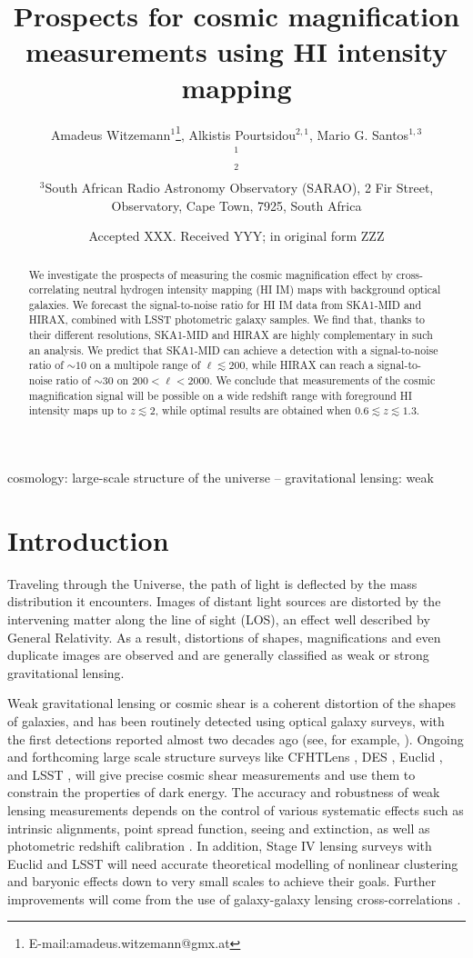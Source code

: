 \documentclass[useAMS,usenatbib]{mnras}
\title[Magnification measurements with HI intensity mapping]
{Prospects for cosmic magnification measurements using HI intensity mapping}
\author[]{Amadeus Witzemann$^{1}$\thanks{E-mail:amadeus.witzemann@gmx.at}, Alkistis Pourtsidou$^{2,1}$, Mario G. Santos$^{1, 3}$\\
$^{1}$\uwc\\
$^{2}$\qmu\\
$^{3}$South African Radio Astronomy Observatory (SARAO), 2 Fir Street, Observatory, Cape Town, 7925, South Africa
}
\date{Accepted XXX. Received YYY; in original form ZZZ}
\begin{document}
\maketitle

\begin{abstract}
We investigate the prospects of measuring the cosmic magnification effect by cross-correlating neutral hydrogen intensity mapping (HI IM) maps with background optical galaxies. We forecast the signal-to-noise ratio for HI IM data from SKA1-MID and HIRAX, combined with LSST photometric galaxy samples. We find that, thanks to their different resolutions, SKA1-MID and HIRAX are highly complementary in such an analysis.
We predict that SKA1-MID can achieve a detection with a signal-to-noise ratio of $\sim 10$ on a multipole range of $\ell \lesssim 200$, while HIRAX can reach a signal-to-noise ratio of $\sim 30$ on $200 < \ell < 2000$.
 We conclude that measurements of the cosmic magnification signal will be possible on a wide redshift range with foreground HI intensity maps up to $z \lesssim 2$, while optimal results are obtained when $0.6 \lesssim z \lesssim 1.3$.
\end{abstract}

\begin{keywords}
cosmology: large-scale structure of the universe -- gravitational lensing: weak
\end{keywords}



\section{Introduction}
Traveling through the Universe, the path of light is deflected by the mass distribution it encounters. Images of distant light sources are distorted by the intervening matter along the line of sight (LOS), an effect well described by General Relativity. As a result, distortions of shapes, magnifications and even duplicate images are observed and are generally classified as weak or strong gravitational lensing.

Weak gravitational lensing or cosmic shear is a coherent distortion of the shapes of galaxies, and has been routinely detected using optical galaxy surveys, with the first detections reported almost two decades ago (see, for example, \citet{Bacon:2000sy,Kaiser:2000if,vanWaerbeke:2000rm,Wittman:2000tc}). Ongoing and forthcoming large scale structure surveys like CFHTLens
\citep{Heymans:2012gg}, DES \citep{Abbott:2016ktf}, Euclid \citep{Amendola:2016saw}, and LSST \citep{Abate:2012za}, will give precise cosmic shear measurements and use them to constrain the properties of dark energy. The accuracy and robustness of weak lensing measurements depends on the control of various systematic effects such as intrinsic alignments, point spread function, seeing and extinction, as well as photometric redshift calibration \citep{Mandelbaum:2017jpr}. In addition, Stage IV lensing surveys with Euclid and LSST will need accurate theoretical modelling of nonlinear clustering and baryonic effects down to very small scales to achieve their goals. Further improvements will come from the use of galaxy-galaxy lensing cross-correlations \citep{vanUitert:2017ieu}.
\end{document}
